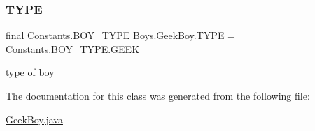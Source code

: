 \subsubsection{\texorpdfstring{T\+Y\+PE}{TYPE}}
{\footnotesize\ttfamily final Constants.\+B\+O\+Y\+\_\+\+T\+Y\+PE Boys.\+Geek\+Boy.\+T\+Y\+PE = Constants.\+B\+O\+Y\+\_\+\+T\+Y\+P\+E.\+G\+E\+EK}

type of boy 

The documentation for this class was generated from the following file\+:\begin{DoxyCompactItemize}
\item 
\hyperlink{_geek_boy_8java}{Geek\+Boy.\+java}\end{DoxyCompactItemize}
